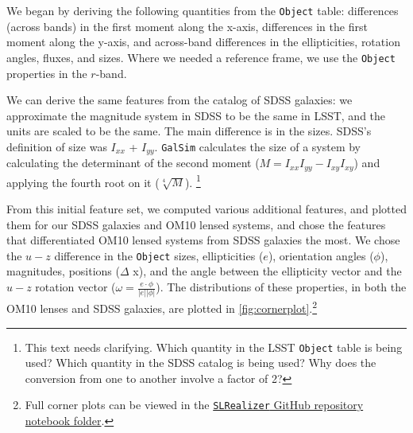 \documentclass[\docopts]{\docclass}
\def\SLRealizer{\texttt{SLRealizer}\xspace}
\def\Object{\texttt{Object}\xspace}
\def\GalSim{\texttt{GalSim}\xspace}
\begin{document}
We began by deriving the following quantities from the \Object table:
differences (across bands) in the first moment along the x-axis,
differences in the first moment along the y-axis,  and across-band
differences in the ellipticities, rotation angles, fluxes, and sizes.
Where we needed a reference frame, we use the \Object properties in the
$r$-band.

We can derive the same features from the catalog of SDSS galaxies: we
approximate the magnitude system in SDSS to be the same in LSST, and the
units are scaled to be the same. The main difference is in the sizes.
SDSS's definition of size was $I_{xx}$ + $I_{yy}$. \GalSim calculates
the size of a system by calculating the determinant of the second moment
($M=I_{xx}I_{yy}-I_{xy}I_{xy}$) and applying the fourth root on it
($\sqrt[4]{M}$). \footnote{This text needs clarifying. Which quantity in the  LSST \Object table is being used? Which quantity in the SDSS catalog is being used? Why does the conversion from one to another involve a factor of 2?}

From this initial feature set, we computed various additional features,
and  plotted them for our SDSS galaxies and OM10 lensed systems, and
chose the features that differentiated OM10 lensed systems from SDSS
galaxies the most. We chose the $u-z$ difference in the \Object sizes,
ellipticities ($e$), orientation angles ($\phi$), magnitudes, positions
($\Delta$ x), and the angle between the ellipticity vector and the $u-z$
rotation vector ($\omega = \frac{e \cdot \phi}{ \left| e \right| \left |
\phi \right |}$).
The distributions of these properties, in both the OM10
lenses and SDSS galaxies, are plotted in
\autoref{fig:cornerplot}.\footnote{Full corner plots can be viewed in
the
\href{https://github.com/jennykim1016/SLRealizer/blob/master/notebooks/SDSSvsOM10.ipynb}{\SLRealizer
GitHub repository notebook folder}.}
\end{document}
